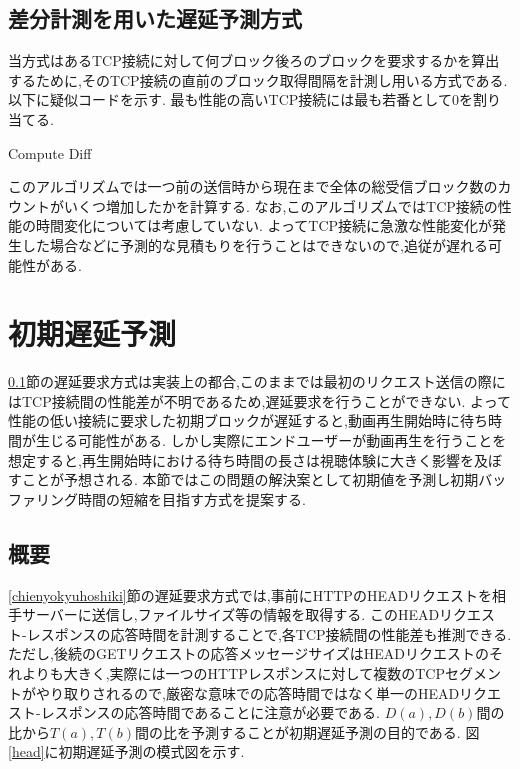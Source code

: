 \documentclass[a4j,12pt]{gradthesis_utf8}
\begin{document}
\subsection{差分計測を用いた遅延予測方式}
\label{diff}
当方式はあるTCP接続に対して何ブロック後ろのブロックを要求するかを算出するために,そのTCP接続の直前のブロック取得間隔を計測し用いる方式である.
以下に疑似コードを示す.
最も性能の高いTCP接続には最も若番として0を割り当てる.

\begin{algorithm}
	\caption{Compute Diff}
	\begin{algorithmic}[1]
		\Else 
		\EndIf
	\end{algorithmic}
\end{algorithm}

このアルゴリズムでは一つ前の送信時から現在まで全体の総受信ブロック数のカウントがいくつ増加したかを計算する.
なお,このアルゴリズムではTCP接続の性能の時間変化については考慮していない.
よってTCP接続に急激な性能変化が発生した場合などに予測的な見積もりを行うことはできないので,追従が遅れる可能性がある.

\newpage

\section{初期遅延予測}
\label{shoki}
\ref{diff}節の遅延要求方式は実装上の都合,このままでは最初のリクエスト送信の際にはTCP接続間の性能差が不明であるため,遅延要求を行うことができない.
よって性能の低い接続に要求した初期ブロックが遅延すると,動画再生開始時に待ち時間が生じる可能性がある.
しかし実際にエンドユーザーが動画再生を行うことを想定すると,再生開始時における待ち時間の長さは視聴体験に大きく影響を及ぼすことが予想される.
本節ではこの問題の解決案として初期値を予測し初期バッファリング時間の短縮を目指す方式を提案する.

\subsection{概要}
\label{shokigaiyo}
\ref{chienyokyuhoshiki}節の遅延要求方式では,事前にHTTPのHEADリクエストを相手サーバーに送信し,ファイルサイズ等の情報を取得する.
このHEADリクエスト-レスポンスの応答時間を計測することで,各TCP接続間の性能差も推測できる.
ただし,後続のGETリクエストの応答メッセージサイズはHEADリクエストのそれよりも大きく,実際には一つのHTTPレスポンスに対して複数のTCPセグメントがやり取りされるので,厳密な意味での応答時間ではなく単一のHEADリクエスト-レスポンスの応答時間であることに注意が必要である.
\begin{math}D(a), D(b)\end{math}間の比から\begin{math}T(a), T(b)\end{math}間の比を予測することが初期遅延予測の目的である.
図\ref{head}に初期遅延予測の模式図を示す.
\end{document}
